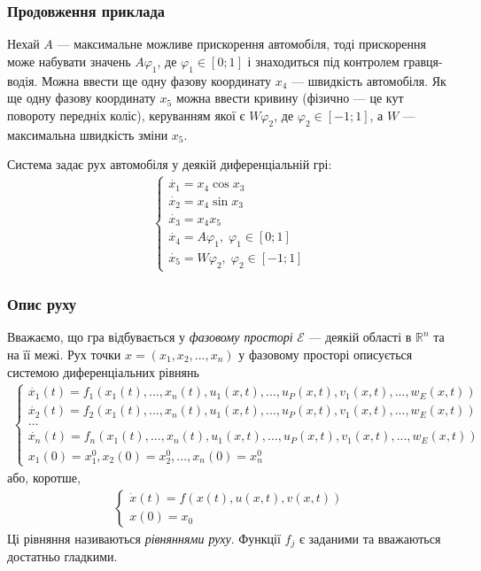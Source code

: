 \documentclass[10pt,pdf]{beamer}
\newcommand{\R}{\mathbb{R}}
\newcommand{\vf}{\varphi}
\renewcommand{\d}[1]{\dot{#1}}
\newcommand{\E}{\mathcal{E}}
\renewcommand{\l}{\left}
\renewcommand{\r}{\right}
\begin{document}
    \begin{frame}
        \frametitle{Продовження приклада}

        Нехай $A$ --- максимальне можливе прискорення автомобіля, тоді прискорення може набувати значень
        $A \vf_1$, де $\vf_1 \in [0; 1]$ і знаходиться під контролем гравця-водія. Можна ввести ще одну фазову координату $x_4$ --- швидкість автомобіля.
        Як ще одну фазову координату $x_5$ можна ввести кривину
        (фізично --- це кут повороту передніх коліс), керуванням якої є $W \vf_2$, де $\vf_2 \in [-1; 1]$, а $W$ --- максимальна швидкість зміни $x_5$.

        Система задає рух автомобіля у деякій диференціальній грі:
        \begin{gather*}
            \begin{cases}
                \d{x_1} = x_4 \cos{x_3} \\
                \d{x_2} = x_4 \sin{x_3} \\
                \d{x_3} = x_4 x_5 \\
                \d{x_4} = A \vf_1, \; \vf_1 \in [0; 1] \\
                \d{x_5} = W \vf_2, \; \vf_2 \in [-1; 1]
            \end{cases}
        \end{gather*}
    \end{frame}
    \begin{frame}
        \frametitle{Опис руху}
    
        Вважаємо, що гра відбувається у \emph{фазовому просторі} $\E$ --- деякій області в $\R^n$ та на її межі.
        Рух точки $x = \l(x_1, x_2, ..., x_n \r)$ у фазовому просторі описується системою диференціальних рівнянь
        \begin{gather*}\label{eq_1}
            \begin{cases}
                \d{x_1}(t) = f_1(x_1(t), ..., x_n(t), u_1(x, t), ..., u_P(x, t), v_1(x, t), ..., w_E(x, t)) \\
                \d{x_2}(t) = f_2(x_1(t), ..., x_n(t), u_1(x, t), ..., u_P(x, t), v_1(x, t), ..., w_E(x, t)) \\
                \dots \\
                \d{x_n}(t) = f_n(x_1(t), ..., x_n(t), u_1(x, t), ..., u_P(x, t), v_1(x, t), ..., w_E(x, t)) \\
                x_1(0) = x_1^0, x_2(0) = x_2^0, ..., x_n(0) = x_n^0
            \end{cases}
        \end{gather*}
        або, коротше,
        \begin{gather*}\label{eq_2}
            \begin{cases}
                \d{x}(t) = {f}(x(t), u(x, t), v(x, t)) \\
                x(0) = x_0
            \end{cases}
        \end{gather*}
        Ці рівняння називаються \emph{рівняннями руху}. Функції $f_j$ є заданими та вважаються достатньо гладкими.
    \end{frame}
\end{document}
